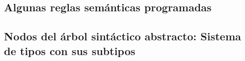\documentclass[12pt,letterpaper]{article}
\begin{document}
\subsection*{Algunas reglas sem\'{a}nticas programadas}


\subsection*{Nodos del \'{a}rbol sint\'{a}ctico abstracto: Sistema de tipos con sus subtipos}

\end{document}

